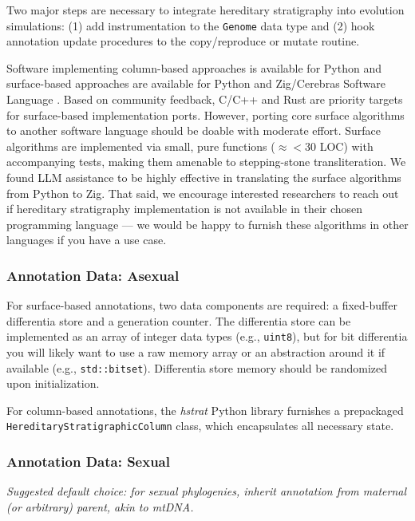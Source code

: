 Two major steps are necessary to integrate hereditary stratigraphy into evolution simulations: (1) add instrumentation to the \texttt{Genome} data type and (2) hook annotation update procedures to the copy/reproduce or mutate routine.

Software implementing column-based approaches is available for Python \citep{moreno2022hstrat} and surface-based approaches are available for Python \citep{moreno2024hsurf} and Zig/Cerebras Software Language \citep{moreno2024wse}.
Based on community feedback, C/C++ and Rust are priority targets for surface-based implementation ports.
However, porting core surface algorithms to another software language should be doable with moderate effort.
Surface algorithms are implemented via small, pure functions ($\approx<30$ LOC) with accompanying tests, making them amenable to stepping-stone transliteration.
We found LLM assistance to be highly effective in translating the surface algorithms from Python to Zig.
That said, we encourage interested researchers to reach out if hereditary stratigraphy implementation is not available in their chosen programming language --- we would be happy to furnish these algorithms in other languages if you have a use case.

\subsubsection{Annotation Data: Asexual}

For surface-based annotations, two data components are required: a fixed-buffer differentia store and a generation counter.
The differentia store can be implemented as an array of integer data types (e.g., \texttt{uint8}), but for bit differentia you will likely want to use a raw memory array or an abstraction around it if available (e.g., \texttt{std::bitset}).
Differentia store memory should be randomized upon initialization.

For column-based annotations, the \textit{hstrat} Python library furnishes a prepackaged \texttt{HereditaryStratigraphicColumn} class, which encapsulates all necessary state.

\subsubsection{Annotation Data: Sexual}
\textit{Suggested default choice: for sexual phylogenies, inherit annotation from maternal (or arbitrary) parent, akin to mtDNA.}

